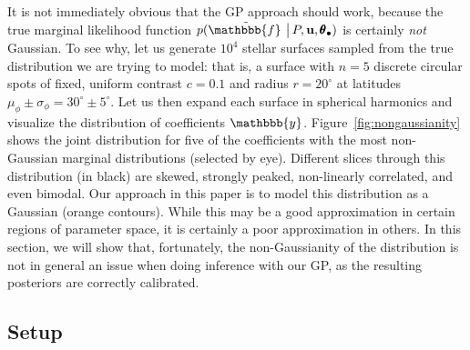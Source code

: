 \documentclass[modern,linenumbers]{aastex62}
\begin{document}
It is not immediately obvious that the GP approach should work, because the
true marginal likelihood function
%
$p ( \tilde{\mathbbb{f}\hspace{0.2em}} \, \big| \, P, \mathbf{u}, \pmb{\theta}_\bullet )$
%
is certainly \emph{not} Gaussian. To see why, let us generate $10^{4}$ stellar
surfaces sampled from the true distribution we are trying to model: that is,
a surface with $n=5$ discrete circular spots of fixed, uniform contrast $c=0.1$
and radius $r=20^\circ$ at latitudes $\mu_\phi \pm \sigma_\phi = 30^\circ \pm 5^\circ$.
Let us then expand each surface in spherical harmonics and visualize the
distribution of coefficients $\mathbbb{y}$. Figure~\ref{fig:nongaussianity}
shows the joint distribution for five of the coefficients with the most
non-Gaussian marginal distributions (selected by eye). Different slices
through this distribution
(in black) are skewed, strongly peaked, non-linearly correlated, and even bimodal.
Our approach in this paper is to model this distribution as a Gaussian
(orange contours). While this may be a good approximation in certain regions
of parameter space, it is certainly a poor approximation in others.
%
In this section, we will show that, fortunately, the non-Gaussianity of the
distribution is not in general an issue when doing inference with our GP,
as the resulting posteriors are correctly calibrated.

\subsection{Setup}
\label{sec:calibration-setup}
\end{document}
